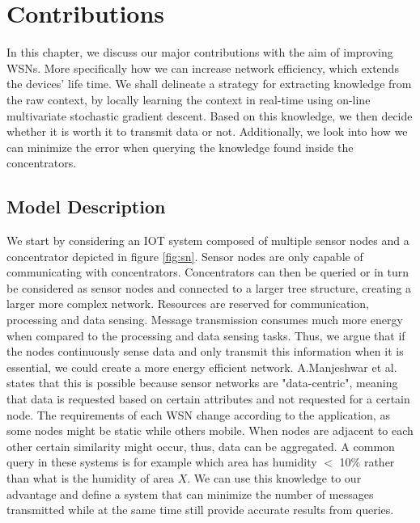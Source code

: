 \documentclass{mproj}
\begin{document}

\chapter{Contributions}
In this chapter, we discuss our major contributions with the aim of improving WSNs. More specifically how we can increase network efficiency, which extends the devices' life time. We shall delineate a strategy for extracting knowledge from the raw context, by locally learning the context in real-time using on-line multivariate stochastic gradient descent. Based on this knowledge, we then decide whether it is worth it to transmit data or not.
Additionally, we look into how we can minimize the error when querying the knowledge found inside the concentrators.

\section{Model Description}
We start by considering an IOT system composed of multiple sensor nodes and a concentrator depicted in figure \ref{fig:sn}. Sensor nodes are only capable of communicating with concentrators. Concentrators can then be queried or in turn be considered as sensor nodes and connected to a larger tree structure, creating a larger more complex network. Resources are reserved for communication, processing and data sensing. Message transmission consumes much more energy when compared to the processing and data sensing tasks. \cite{teen} Thus, we argue that if the nodes continuously sense data and only transmit this information when it is essential, we could create a more energy efficient network. A.Manjeshwar et al. \cite{teen} states that this is possible because sensor networks are "data-centric", meaning that data is requested based on certain attributes and not requested for a certain node. The requirements of each WSN change according to the application, as some nodes might be static while others mobile. When nodes are adjacent to each other certain similarity might occur, thus, data can be aggregated. A common query in these systems is for example which area has humidity $<$ 10\% rather than what is the humidity of area $X$. We can use this knowledge to our advantage and define a system that can minimize the number of messages transmitted while at the same time still provide accurate results from queries.
\end{document}
